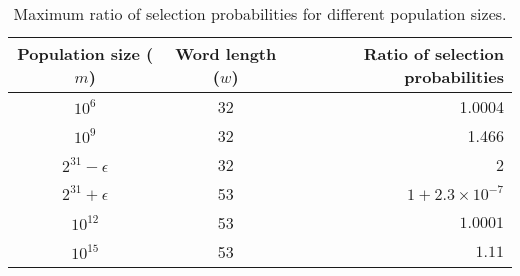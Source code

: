 \documentclass[12pt]{article}
\begin{document}
\begin{table}[h]
\caption{Maximum ratio of selection probabilities for different population sizes.}
\begin{center}
\begin{tabular}{|c|c|r|}


Population size ($m$) & Word length ($w$) & Ratio of selection probabilities\\
\hline 
$10^6$ & 32 & 1.0004 \\
$10^9$ & 32 & 1.466 \\
 $2^{31}-\epsilon$ & 32 & 2 \\
$2^{31}+\epsilon$ & 53 & $1 + 2.3 \times 10^{-7}$ \\
$10^{12}$ & 53 & $1.0001$ \\
$10^{15}$ & 53 & $1.11$ \\

\end{tabular}
\end{center}
\label{tab}
\end{table}%




\end{document}
